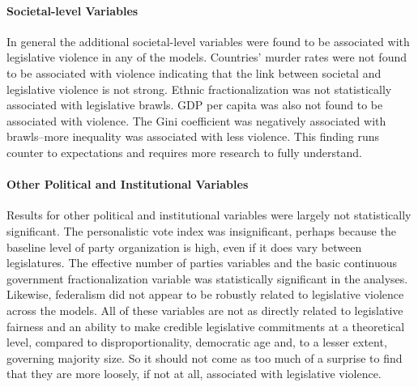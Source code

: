 \documentclass[a4paper]{article}\usepackage[]{graphicx}\usepackage[]{color}
\begin{document}

\paragraph{Societal-level Variables}

In general the additional societal-level variables were found to be associated with legislative violence in any of the models. Countries' murder rates were not found to be associated with violence indicating that the link between societal and legislative violence is not strong. Ethnic fractionalization was not statistically associated with legislative brawls. GDP per capita was also not found to be associated with violence. The Gini coefficient was negatively associated with brawls--more inequality was associated with less violence. This finding runs counter to expectations and requires more research to fully understand.

\paragraph{Other Political and Institutional Variables}

Results for other political and institutional variables were largely not statistically significant. The personalistic vote index was insignificant, perhaps because the baseline level of party organization is high, even if it does vary between legislatures. The effective number of parties variables and the basic continuous government fractionalization variable was statistically significant in the analyses. Likewise, federalism did not appear to be robustly related to legislative violence across the models. All of these variables are not as directly related to legislative fairness and an ability to make credible legislative commitments at a theoretical level, compared to disproportionality, democratic age and, to a lesser extent, governing majority size. So it should not come as too much of a surprise to find that they are more loosely, if not at all, associated with legislative violence.
\end{document}
